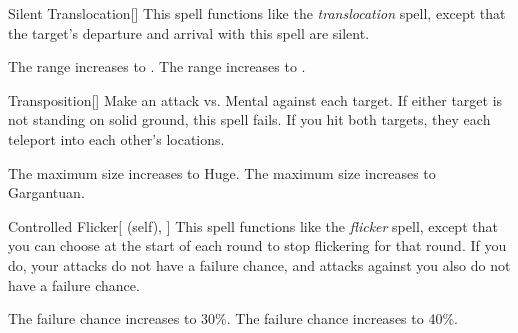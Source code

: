 \lowercase{\hypertarget{spell:Silent Translocation}{}}\label{spell:Silent Translocation}
\begin{freeability}[Rank 3]{\hypertarget{spell:Silent Translocation}{Silent Translocation}}[]
This spell functions like the \textit{translocation} spell, except that the target's departure and arrival with this spell are silent.

\rankline
{} The range increases to \rngmed.
 The range increases to \rnglong.

\end{freeability}
\vspace{0.25em}



\lowercase{\hypertarget{spell:Transposition}{}}\label{spell:Transposition}
\begin{freeability}[Rank 3]{\hypertarget{spell:Transposition}{Transposition}}[]
Make an attack vs. Mental against each target.
If either target is not standing on solid ground, this spell fails.
If you hit both targets, they each teleport into each other's locations.

\rankline
{} The maximum size increases to Huge.
 The maximum size increases to Gargantuan.

\end{freeability}
\vspace{0.25em}



\lowercase{\hypertarget{spell:Controlled Flicker}{}}\label{spell:Controlled Flicker}
\begin{attuneability}[Rank 4]{\hypertarget{spell:Controlled Flicker}{Controlled Flicker}}[ (self), ]
This spell functions like the \textit{flicker} spell, except that you can choose at the start of each round to stop flickering for that round.
If you do, your attacks do not have a failure chance, and attacks against you also do not have a failure chance.

\rankline
{} The failure chance increases to 30\%.
 The failure chance increases to 40\%.

\end{attuneability}
\vspace{0.25em}



